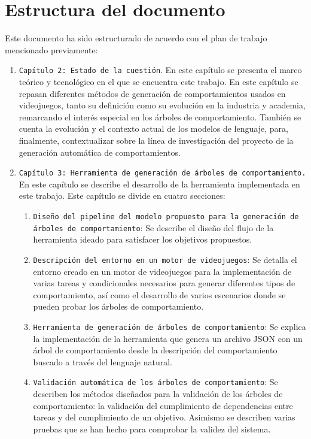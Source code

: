 \section{Estructura del documento}
Este documento ha sido estructurado de acuerdo con el plan de trabajo mencionado previamente:

\begin{enumerate}
	\item \texttt{Capítulo 2: Estado de la cuestión}. En este capítulo se presenta el marco teórico y tecnológico en el que se encuentra este trabajo.
	En este capítulo se repasan diferentes métodos de generación de comportamientos usados en videojuegos, tanto su definición como su evolución en la industria y academia, remarcando el interés especial en los árboles de comportamiento.
	También se cuenta la evolución y el contexto actual de los modelos de lenguaje, para, finalmente, contextualizar sobre la línea de investigación del proyecto de la generación automática de comportamientos.
	\item \texttt{Capítulo 3: Herramienta de generación de árboles de comportamiento.} En este capítulo se describe el desarrollo de la herramienta implementada en este trabajo.
	Este capítulo se divide en cuatro secciones:
	\begin{enumerate}
		\item \texttt{Diseño del pipeline del modelo propuesto para la generación de árboles de comportamiento}: Se describe el diseño del flujo de la herramienta ideado para satisfacer los objetivos propuestos.
		\item \texttt{Descripción del entorno en un motor de videojuegos}: Se detalla el entorno creado en un motor de videojuegos para la implementación de varias tareas y condicionales necesarios para generar diferentes tipos de comportamiento, así como el desarrollo de varios escenarios donde se pueden probar los árboles de comportamiento.
		\item \texttt{Herramienta de generación de árboles de comportamiento}: Se explica la implementación de la herramienta que genera un archivo JSON con un árbol de comportamiento desde la descripción del comportamiento buscado a través del lenguaje natural.
		\item \texttt{Validación automática de los árboles de comportamiento}: Se describen los métodos diseñados para la validación de los árboles de comportamiento: la validación del cumplimiento de dependencias entre tareas y del cumplimiento de un objetivo. Asimismo se describen varias pruebas que se han hecho para comprobar la validez del sistema.

\end{enumerate}
\end{enumerate}
